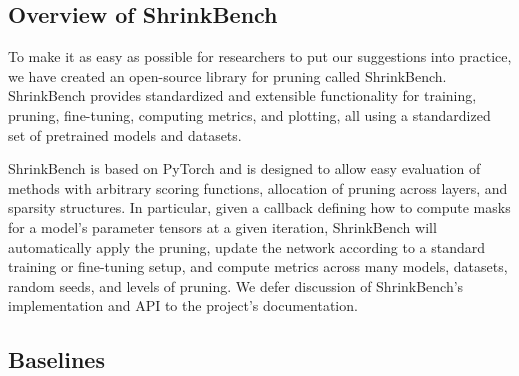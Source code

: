 \newcommand{\SB}{ShrinkBench}
\newcommand{\NEXP}{800} %


\vspace{1mm}



\subsection{Overview of ShrinkBench}

To make it as easy as possible for researchers to put our suggestions into practice, we have created an open-source library for pruning called ShrinkBench. %
ShrinkBench provides standardized and extensible functionality for training, pruning, fine-tuning, computing metrics, and plotting, all using a standardized set of pretrained models and datasets.

ShrinkBench is based on PyTorch \cite{pytorch} and is designed to allow easy evaluation of methods with arbitrary scoring functions, allocation of pruning across layers, and sparsity structures. In particular, given a callback defining how to compute masks for a model's parameter tensors at a given iteration, ShrinkBench will automatically apply the pruning, update the network according to a standard training or fine-tuning setup, and compute metrics across many models, datasets, random seeds, and levels of pruning.
We defer discussion of ShrinkBench's implementation and API to the project's documentation.

\subsection{Baselines}

